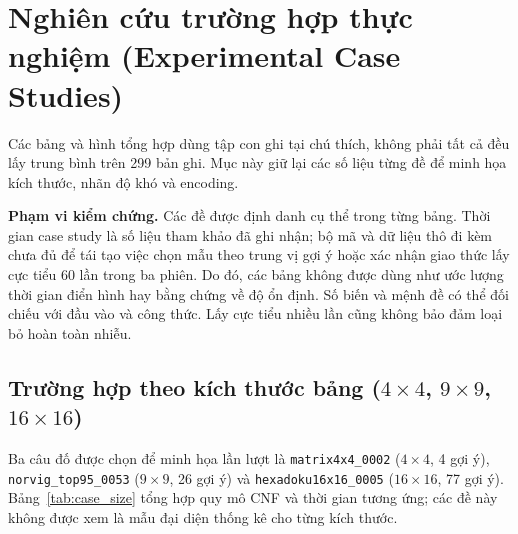 \documentclass[a4paper,fleqn,nologo]{cas-sc}
\begin{document}
\section{Nghiên cứu trường hợp thực nghiệm (Experimental Case Studies)}
\label{sec:cases}

Các bảng và hình tổng hợp dùng tập con ghi tại chú thích, không phải tất cả đều lấy trung bình trên 299 bản ghi. Mục này giữ lại các số liệu từng đề để minh họa kích thước, nhãn độ khó và encoding.

\textbf{Phạm vi kiểm chứng.} Các đề được định danh cụ thể trong từng bảng. Thời gian case study là số liệu tham khảo đã ghi nhận; bộ mã và dữ liệu thô đi kèm chưa đủ để tái tạo việc chọn mẫu theo trung vị gợi ý hoặc xác nhận giao thức lấy cực tiểu 60 lần trong ba phiên. Do đó, các bảng không được dùng như ước lượng thời gian điển hình hay bằng chứng về độ ổn định. Số biến và mệnh đề có thể đối chiếu với đầu vào và công thức. Lấy cực tiểu nhiều lần cũng không bảo đảm loại bỏ hoàn toàn nhiễu.

\subsection{Trường hợp theo kích thước bảng ($4\times4$, $9\times9$, $16\times16$)}
Ba câu đố được chọn để minh họa lần lượt là \texttt{matrix4x4\_0002} ($4\times4$, 4 gợi ý), \texttt{norvig\_top95\_0053} ($9\times9$, 26 gợi ý) và \texttt{hexadoku16x16\_0005} ($16\times16$, 77 gợi ý). Bảng~\ref{tab:case_size} tổng hợp quy mô CNF và thời gian tương ứng; các đề này không được xem là mẫu đại diện thống kê cho từng kích thước.
\end{document}
